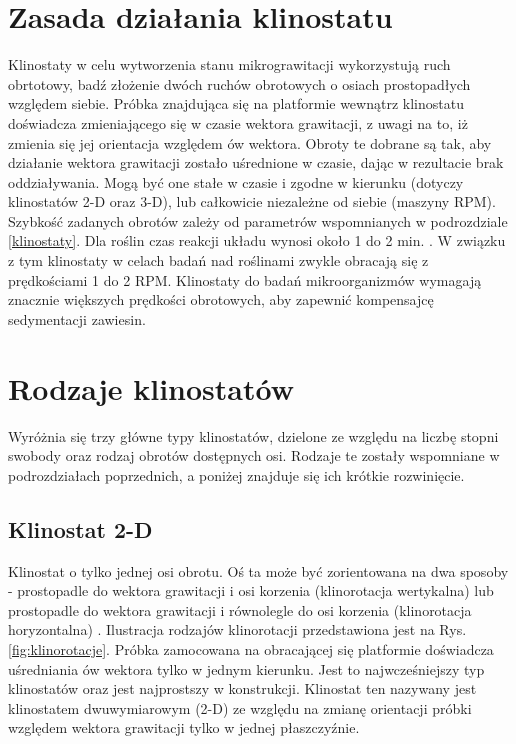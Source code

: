 \section{Zasada działania klinostatu}

Klinostaty w celu wytworzenia stanu mikrograwitacji wykorzystują ruch obrtotowy, badź
 złożenie dwóch ruchów obrotowych o osiach prostopadłych względem siebie. Próbka
  znajdująca się na platformie wewnątrz klinostatu doświadcza zmieniającego się w czasie
   wektora grawitacji, z uwagi na to, iż zmienia się jej orientacja względem ów wektora.
    Obroty te dobrane są tak, aby działanie wektora grawitacji zostało uśrednione w
     czasie, dając w rezultacie brak oddziaływania. Mogą być one stałe w czasie i zgodne
      w kierunku (dotyczy klinostatów 2-D oraz 3-D), lub całkowicie niezależne od siebie
       (maszyny RPM). Szybkość zadanych obrotów zależy od parametrów wspomnianych w
        podrozdziale \ref{klinostaty}. Dla roślin czas reakcji układu wynosi około 1 do
         2 min. \cite{bib:klinostat_lafayette}. W związku z tym klinostaty w celach badań
          nad roślinami zwykle obracają się z prędkościami 1 do 2 RPM. Klinostaty do
           badań mikroorganizmów wymagają znacznie większych prędkości obrotowych, aby
            zapewnić kompensajcę sedymentacji zawiesin.
            

\section{Rodzaje klinostatów}

Wyróżnia się trzy główne typy klinostatów, dzielone ze względu na liczbę stopni swobody
 oraz rodzaj obrotów dostępnych osi. Rodzaje te zostały wspomniane \linebreak w podrozdziałach
  poprzednich, a poniżej znajduje się ich krótkie rozwinięcie.

\subsection{Klinostat 2-D}

Klinostat o tylko jednej osi obrotu. Oś ta może być zorientowana na dwa sposoby -
 prostopadle do wektora grawitacji i osi korzenia (klinorotacja wertykalna) lub
  prostopadle do wektora grawitacji i równolegle do osi korzenia (klinorotacja
   horyzontalna) \cite{bib:klinorotacja} . Ilustracja rodzajów klinorotacji
    przedstawiona jest na Rys. \ref{fig:klinorotacje}. Próbka zamocowana na
     obracającej się platformie doświadcza uśredniania ów wektora tylko w jednym
      kierunku. Jest to najwcześniejszy typ klinostatów oraz jest najprostszy w
       konstrukcji. Klinostat ten nazywany jest klinostatem dwuwymiarowym (2-D) ze
        względu na zmianę orientacji próbki względem wektora grawitacji tylko w jednej
         płaszczyźnie.

